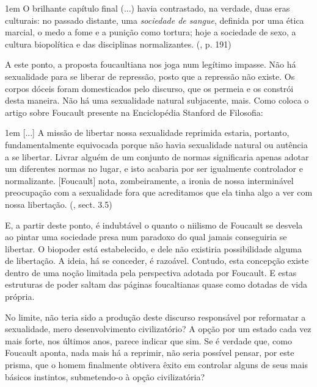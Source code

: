 \documentclass[12pt,a4paper]{article}
\newenvironment{citac}
{
	\begin{addmargin}
		[4cm]{1em} \footnotesize}{\normalfont 
	\end{addmargin}
}
\begin{document}
	\begin{citac}
		O brilhante capítulo final (...) havia contrastado, na verdade, 
		duas eras culturais: no passado distante, uma \textit{sociedade 
		de sangue}, definida por uma ética marcial, o medo a fome e a 
		punição como tortura; hoje a {sociedade de sexo}, a cultura 
		biopolítica e das disciplinas normalizantes. 
		(\cite{merquior}, p. 191)
	\end{citac}
	
	A este ponto, a proposta foucaultiana nos joga num 
	legítimo impasse. Não há sexualidade para se liberar de repressão, 
	posto que a repressão não existe. Os corpos dóceis foram domesticados 
	pelo discurso, que os permeia e os constrói desta maneira. Não há uma 
	sexualidade natural subjacente, mais. Como coloca o artigo sobre 
	Foucault presente na Enciclopédia Stanford de Filosofia: 
	
	\begin{citac}
		[...] A missão de libertar nossa sexualidade reprimida estaria, 
		portanto, fundamentalmente equivocada porque não havia sexualidade 
		natural ou autência a se libertar. Livrar alguém de um conjunto de 
		normas significaria apenas adotar um diferentes normas no lugar, 
		e isto acabaria por ser igualmente controlador e normalizante. 
		[Foucault] nota, zombeiramente, a ironia de nossa interminável 
		preocupação com a sexualidade fora que acreditamos que ela tinha 
		algo a ver com nossa libertação. 
		(\cite{sep}, sect. 3.5)
	\end{citac}	
	
	E, a partir deste ponto, é indubtável o quanto o niilismo de Foucault 
	se desvela ao pintar uma sociedade presa num paradoxo do qual jamais 
	conseguiria se libertar. O biopoder está estabelecido, e dele não 
	existiria possibilidade alguma de libertação. A ideia, há se conceder, 
	é razoável. Contudo, esta concepção existe dentro de uma noção limitada 
	pela perspectiva adotada por Foucault. E estas estruturas de poder saltam 
	das páginas foucaltianas quase como dotadas de vida própria. 
	
	No limite, não teria sido a produção deste discurso responsável por 
	reformatar a sexualidade, mero desenvolvimento civilizatório? A opção 
	por um estado cada vez mais forte, nos últimos anos, parece indicar que 
	sim. Se é verdade que, como Foucault aponta, nada mais há a reprimir, 
	não seria possível pensar, por este prisma, que o homem finalmente 
	obtivera êxito em controlar alguns de seus mais básicos instintos, 
	submetendo-o à opção civilizatória? 
	
\end{document}
